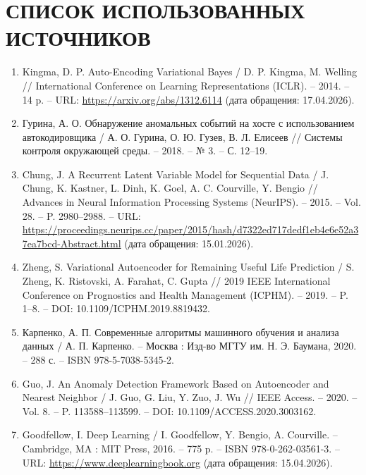 \documentclass[14pt, a4paper, oneside]{extreport}
\begin{document}
\section{СПИСОК ИСПОЛЬЗОВАННЫХ ИСТОЧНИКОВ}
\vspace{1em}
\begin{enumerate}

\item Kingma, D. P. Auto-Encoding Variational Bayes / D. P. Kingma, M. Welling // International Conference on Learning Representations (ICLR). – 2014. – 14 p. – URL: \url{https://arxiv.org/abs/1312.6114} (дата обращения: 17.04.2026).

\item Гурина, А. О. Обнаружение аномальных событий на хосте с использованием автокодировщика / А. О. Гурина, О. Ю. Гузев, В. Л. Елисеев // Системы контроля окружающей среды. – 2018. – № 3. – С. 12–19.

\item Chung, J. A Recurrent Latent Variable Model for Sequential Data / J. Chung, K. Kastner, L. Dinh, K. Goel, A. C. Courville, Y. Bengio // Advances in Neural Information Processing Systems (NeurIPS). – 2015. – Vol. 28. – P. 2980–2988. – URL: \url{https://proceedings.neurips.cc/paper/2015/hash/d7322ed717dedf1eb4e6e52a37ea7bcd-Abstract.html} (дата обращения: 15.01.2026).


\item Zheng, S. Variational Autoencoder for Remaining Useful Life Prediction / S. Zheng, K. Ristovski, A. Farahat, C. Gupta // 2019 IEEE International Conference on Prognostics and Health Management (ICPHM). – 2019. – P. 1–8. – DOI: 10.1109/ICPHM.2019.8819432.

\item Карпенко, А. П. Современные алгоритмы машинного обучения и анализа данных / А. П. Карпенко. – Москва : Изд-во МГТУ им. Н. Э. Баумана, 2020. – 288 с. – ISBN 978-5-7038-5345-2.

\item Guo, J. An Anomaly Detection Framework Based on Autoencoder and Nearest Neighbor / J. Guo, G. Liu, Y. Zuo, J. Wu // IEEE Access. – 2020. – Vol. 8. – P. 113588–113599. – DOI: 10.1109/ACCESS.2020.3003162.

\item Goodfellow, I. Deep Learning / I. Goodfellow, Y. Bengio, A. Courville. – Cambridge, MA : MIT Press, 2016. – 775 p. – ISBN 978-0-262-03561-3. – URL: \url{https://www.deeplearningbook.org} (дата обращения: 15.04.2026).


\end{enumerate}
\end{document}
